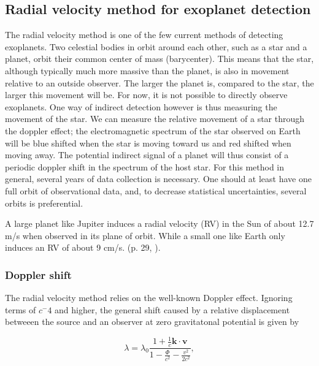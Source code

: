 \subsection{Radial velocity method for exoplanet detection}
The radial velocity method is one of the few current methods of detecting exoplanets. Two celestial bodies in orbit around each other, such as a star and a planet, orbit their common center of mass (barycenter). This means that the star, although typically much more massive than the planet, is also in movement relative to an outside observer. The larger the planet is, compared to the star, the larger this movement will be. For now, it is not possible to directly observe exoplanets. One way of indirect detection however is thus measuring the movement of the star. We can measure the relative movement of a star through the doppler effect; the electromagnetic spectrum of the star observed on Earth will be blue shifted when the star is moving toward us and red shifted when moving away. The potential indirect signal of a planet will thus consist of a periodic doppler shift in the spectrum of the host star. For this method in general, several years of data collection is necessary. One should at least have one full orbit of observational data, and, to decrease statistical uncertainties, several orbits is preferential.

A large planet like Jupiter induces a radial velocity (RV) in the Sun of about 12.7 m/s when observed in its plane of orbit. While a small one like Earth only induces an RV of about 9 cm/s. (p. 29, \cite{radial_velocity_techniques}). 

\vspace{0.5cm}

\subsubsection{Doppler shift}

The radial velocity method relies on the well-known Doppler effect. Ignoring terms of $c^-4$ and higher, the general shift caused by a relative displacement betweeen the source and an observer at zero gravitatonal potential is given by 

\begin{equation}
    \label{eq:doppler_GR_SR}
    \lambda=\lambda_{0} \frac{1+\frac{1}{c} \mathbf{k} \cdot \mathbf{v}}{1-\frac{\Phi}{c^{2}}-\frac{v^{2}}{2 c^{2}}},
\end{equation}

